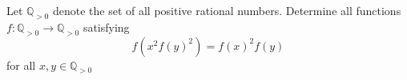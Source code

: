 Let $\mathbb{Q}_{>0}$ denote the set of all positive rational numbers. Determine all functions $f:\mathbb{Q}_{>0}\to \mathbb{Q}_{>0}$ satisfying $$f(x^2f(y)^2)=f(x)^2f(y)$$for all $x,y\in\mathbb{Q}_{>0}$